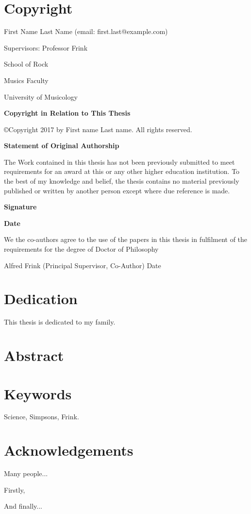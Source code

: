 \chapter*{Copyright}

First Name Last Name (email: first.last@example.com)

Supervisors: Professor Frink

School of Rock

Musics Faculty

University of Musicology

\textbf{Copyright in Relation to This Thesis}

\copyright Copyright 2017 by First name Last name. All rights reserved.

\textbf{Statement of Original Authorship}

The Work contained in this thesis has not been previously submitted to meet
requirements for an award at this or any other higher education institution. To
the best of my knowledge and belief, the thesis contains no material previously
published or written by another person except where due reference is made.

\textbf{Signature}

\textbf{Date}

We the co-authors agree to the use of the papers in this thesis in fulfilment of
the requirements for the degree of Doctor of Philosophy


Alfred Frink (Principal Supervisor, Co-Author) Date


\chapter*{Dedication}

This thesis is dedicated to my family.


\chapter*{Abstract}


\chapter*{Keywords}

Science, Simpsons, Frink.


\chapter*{Acknowledgements}

Many people...

Firstly,

And finally...

